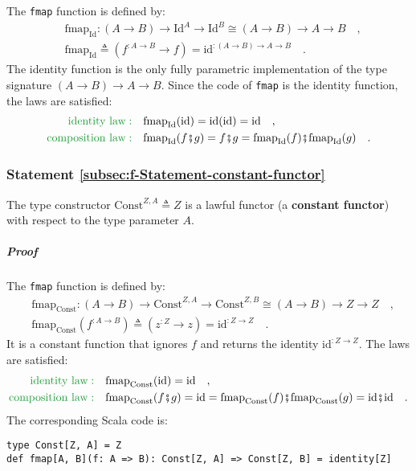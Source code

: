 The \lstinline!fmap! function is defined by:
\begin{align*}
 & \text{fmap}_{\text{Id}}:\left(A\rightarrow B\right)\rightarrow\text{Id}^{A}\rightarrow\text{Id}^{B}\cong\left(A\rightarrow B\right)\rightarrow A\rightarrow B\quad,\\
 & \text{fmap}_{\text{Id}}\triangleq(f^{:A\rightarrow B}\rightarrow f)=\text{id}^{:(A\rightarrow B)\rightarrow A\rightarrow B}\quad.
\end{align*}
The identity function is the only fully parametric implementation
of the type signature $\left(A\rightarrow B\right)\rightarrow A\rightarrow B$.
Since the code of \lstinline!fmap! is the identity function, the
laws are satisfied:
\begin{align*}
{\color{greenunder}\text{identity law}:}\quad & \text{fmap}_{\text{Id}}(\text{id})=\text{id}(\text{id})=\text{id}\quad,\\
{\color{greenunder}\text{composition law}:}\quad & \text{\ensuremath{\text{fmap}_{\text{Id}}}}(f\bef g)=f\bef g=\text{fmap}_{\text{Id}}(f)\bef\text{fmap}_{\text{Id}}(g)\quad.
\end{align*}


\subsubsection{Statement \label{subsec:f-Statement-constant-functor}\ref{subsec:f-Statement-constant-functor}}

The type constructor $\text{Const}^{Z,A}\triangleq Z$
is a lawful functor (a \textbf{constant functor}) with respect to
the type parameter $A$.

\subparagraph{Proof}

The \lstinline!fmap! function is defined by:
\begin{align*}
 & \text{fmap}_{\text{Const}}:\left(A\rightarrow B\right)\rightarrow\text{Const}^{Z,A}\rightarrow\text{Const}^{Z,B}\cong\left(A\rightarrow B\right)\rightarrow Z\rightarrow Z\quad,\\
 & \text{fmap}_{\text{Const}}(f^{:A\rightarrow B})\triangleq(z^{:Z}\rightarrow z)=\text{id}^{:Z\rightarrow Z}\quad.
\end{align*}
It is a constant function that ignores $f$ and returns the identity
$\text{id}^{:Z\rightarrow Z}$. The laws are satisfied:
\begin{align*}
{\color{greenunder}\text{identity law}:}\quad & \text{fmap}_{\text{Const}}(\text{id})=\text{id}\quad,\\
{\color{greenunder}\text{composition law}:}\quad & \text{\ensuremath{\text{fmap}_{\text{Const}}}}(f\bef g)=\text{id}=\text{fmap}_{\text{Const}}(f)\bef\text{fmap}_{\text{Const}}(g)=\text{id}\bef\text{id}\quad.
\end{align*}
The corresponding Scala code is:
\begin{lstlisting}
type Const[Z, A] = Z
def fmap[A, B](f: A => B): Const[Z, A] => Const[Z, B] = identity[Z]
\end{lstlisting}

